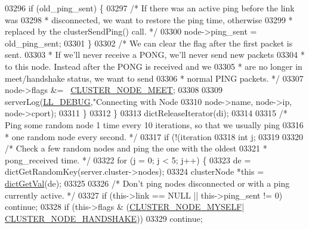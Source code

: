 \begin{DoxyCode}
{{{{{{{{{{{{{{{{{{{{{{{{{{{{{{{{{{{{{{{{{{{{{{{{{{{{{{{{{{03296             \textcolor{keywordflow}{if} (old\_ping\_sent) \{
03297                 \textcolor{comment}{/* If there was an active ping before the link was}
03298 \textcolor{comment}{                 * disconnected, we want to restore the ping time, otherwise}
03299 \textcolor{comment}{                 * replaced by the clusterSendPing() call. */}
03300                 node->ping\_sent = old\_ping\_sent;
03301             \}
03302             \textcolor{comment}{/* We can clear the flag after the first packet is sent.}
03303 \textcolor{comment}{             * If we'll never receive a PONG, we'll never send new packets}
03304 \textcolor{comment}{             * to this node. Instead after the PONG is received and we}
03305 \textcolor{comment}{             * are no longer in meet/handshake status, we want to send}
03306 \textcolor{comment}{             * normal PING packets. */}
03307             node->flags &= ~\hyperlink{cluster_8h_ad992a5c70af8bc805aae5405106ff9f7}{CLUSTER\_NODE\_MEET};
03308 
03309             serverLog(\hyperlink{server_8h_abcaffe365dee628fcf9fc90c69d534a1}{LL\_DEBUG},\textcolor{stringliteral}{"Connecting with Node %
03310                     node->name, node->ip, node->cport);
03311         \}
03312     \}
03313     dictReleaseIterator(di);
03314 
03315     \textcolor{comment}{/* Ping some random node 1 time every 10 iterations, so that we usually ping}
03316 \textcolor{comment}{     * one random node every second. */}
03317     \textcolor{keywordflow}{if} (!(iteration %
03318         \textcolor{keywordtype}{int} j;
03319 
03320         \textcolor{comment}{/* Check a few random nodes and ping the one with the oldest}
03321 \textcolor{comment}{         * pong\_received time. */}
03322         \textcolor{keywordflow}{for} (j = 0; j < 5; j++) \{
03323             de = dictGetRandomKey(server.cluster->nodes);
03324             clusterNode *\textcolor{keyword}{this} = \hyperlink{dict_8h_ae8d2cc391873b2bea2b87c4f80f43120}{dictGetVal}(de);
03325 
03326             \textcolor{comment}{/* Don't ping nodes disconnected or with a ping currently active. */}
03327             \textcolor{keywordflow}{if} (\textcolor{keyword}{this}->link == NULL || \textcolor{keyword}{this}->ping\_sent != 0) \textcolor{keywordflow}{continue};
03328             \textcolor{keywordflow}{if} (\textcolor{keyword}{this}->flags & (\hyperlink{cluster_8h_afee946c4e74c08465e9b4ead5e3659e6}{CLUSTER\_NODE\_MYSELF}|
      \hyperlink{cluster_8h_a60571342a067f1e5772a04b36feff6a6}{CLUSTER\_NODE\_HANDSHAKE}))
03329                 \textcolor{keywordflow}{continue};
}}}}}}}}}}}}}}}}}}}}}}}}}}}}}}}}}}}}}}}}}}}}}}}}}}}}}}}}}}}
\end{DoxyCode}
